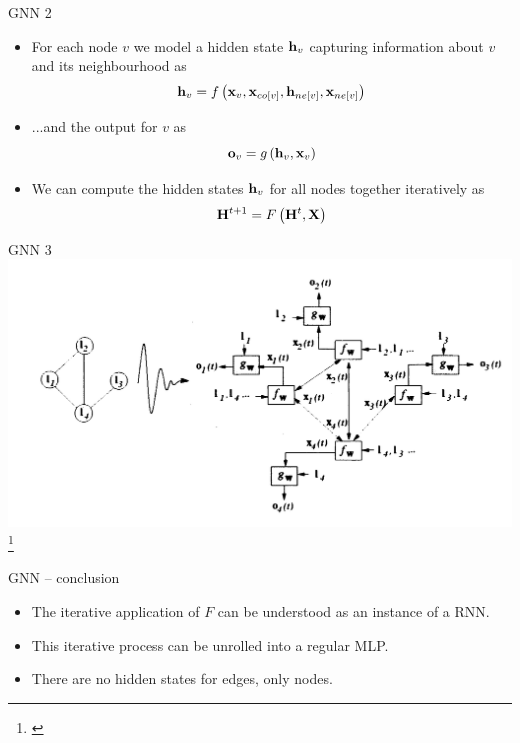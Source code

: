 \documentclass[10pt]{beamer}
\newcommand{\mathvec}{\ensuremath{\mathbf}}
\newcommand{\mathmat}{\ensuremath{\mathbf}}
\begin{document}
\begin{frame}{GNN 2}
	\begin{itemize}
		\item For each node \( v \) we model a hidden state \( \mathvec{h}_v \) capturing information about \( v \) and its neighbourhood as
			\[ \mathvec{h}_v = f \left( \mathvec{x}_v, \mathvec{x}_{co \left[ v \right]}, \mathvec{h}_{ne \left[ v \right]}, \mathvec{x}_{ne \left[ v \right]} \right) \]
		\item ...and the output for \( v \) as
			\[ \mathvec{o}_v = g \left( \mathvec{h}_v, \mathvec{x}_v \right) \]
		\item We can compute the hidden states \( \mathvec{h}_v \) for all nodes together iteratively as
			\[ \mathmat{H}^{t + 1} = F \left( \mathmat{H}^t, \mathmat{X} \right) \]
	\end{itemize}
\end{frame}

\begin{frame}{GNN 3}
	\centering
	\includegraphics[width=0.9\pagewidth]{images/GNN.png}\footnote{\cite{gori_new_2005}}
\end{frame}

\begin{frame}{GNN -- conclusion}
	\begin{itemize}
		\item The iterative application of \( F \) can be understood as an instance of a RNN.
		\item This iterative process can be unrolled into a regular MLP.
		\item There are no hidden states for edges, only nodes.
	\end{itemize}
\end{frame}
\end{document}
